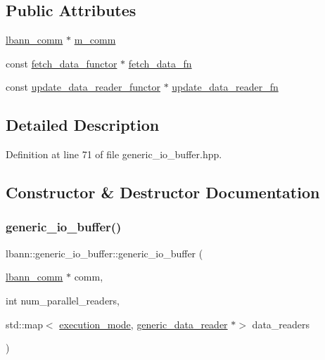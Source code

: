 \subsection*{Public Attributes}
\begin{DoxyCompactItemize}
\item 
\hyperlink{classlbann_1_1lbann__comm}{lbann\+\_\+comm} $\ast$ \hyperlink{classlbann_1_1generic__io__buffer_a2e4a46c85c8b30e10b1cc5acaa2c4cca}{m\+\_\+comm}
\item 
const \hyperlink{classlbann_1_1fetch__data__functor}{fetch\+\_\+data\+\_\+functor} $\ast$ \hyperlink{classlbann_1_1generic__io__buffer_a267170b4fd11dc60c782a9cb2b7b06cc}{fetch\+\_\+data\+\_\+fn}
\item 
const \hyperlink{classlbann_1_1update__data__reader__functor}{update\+\_\+data\+\_\+reader\+\_\+functor} $\ast$ \hyperlink{classlbann_1_1generic__io__buffer_a031eda7559a9e241afb3958b56088560}{update\+\_\+data\+\_\+reader\+\_\+fn}
\end{DoxyCompactItemize}


\subsection{Detailed Description}


Definition at line 71 of file generic\+\_\+io\+\_\+buffer.\+hpp.



\subsection{Constructor \& Destructor Documentation}
\mbox{\label{classlbann_1_1generic__io__buffer_a21e2ef867da6fb0fa334d751ae6b692f}} 
\subsubsection{\texorpdfstring{generic\+\_\+io\+\_\+buffer()}{generic\_io\_buffer()}\hspace{0.1cm}{\footnotesize\ttfamily [1/2]}}
{\footnotesize\ttfamily lbann\+::generic\+\_\+io\+\_\+buffer\+::generic\+\_\+io\+\_\+buffer (\begin{DoxyParamCaption}\item[{\hyperlink{classlbann_1_1lbann__comm}{lbann\+\_\+comm} $\ast$}]{comm,  }\item[{int}]{num\+\_\+parallel\+\_\+readers,  }\item[{std\+::map$<$ \hyperlink{base_8hpp_a2781a159088df64ed7d47cc91c4dc0a8}{execution\+\_\+mode}, \hyperlink{classlbann_1_1generic__data__reader}{generic\+\_\+data\+\_\+reader} $\ast$$>$}]{data\+\_\+readers }\end{DoxyParamCaption})}



